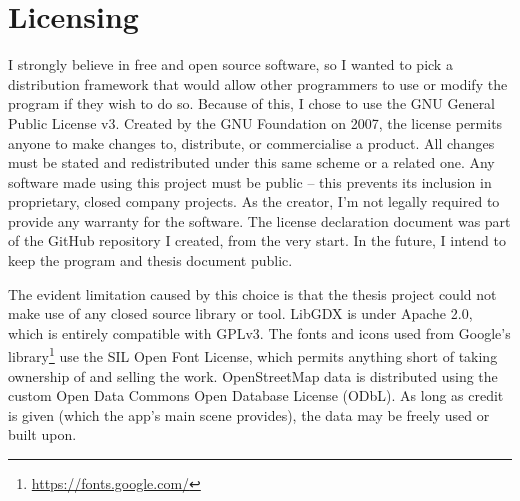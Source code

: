 \label{licensing}
\section{Licensing}

I strongly believe in free and open source software, so I wanted to pick a distribution framework that would allow other programmers to use or modify the program if they wish to do so. Because of this, I chose to use the GNU General Public License v3. Created by the GNU Foundation on 2007, the license permits anyone to make changes to, distribute, or commercialise a product. All changes must be stated and redistributed under this same scheme or a related one. Any software made using this project must be public -- this prevents its inclusion in proprietary, closed company projects. As the creator, I'm not legally required to provide any warranty for the software.\cite{choose-gpl3} The license declaration document was part of the GitHub repository I created, from the very start. In the future, I intend to keep the program and thesis document public.

The evident limitation caused by this choice is that the thesis project could not make use of any closed source library or tool. LibGDX is under Apache 2.0, which is entirely compatible with GPLv3. The fonts and icons used from Google's library\footnote{\url{https://fonts.google.com/}} use the SIL Open Font License, which permits anything short of taking ownership of and selling the work. OpenStreetMap data is distributed using the custom Open Data Commons Open Database License (ODbL). As long as credit is given (which the app's main scene provides), the data may be freely used or built upon.